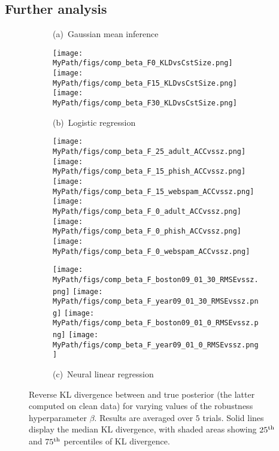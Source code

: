 \subsection{Further analysis}
\label{sec:sensitivity}

\begin{figure}[!tp]
	\begin{subfigure}[]{0.995\textwidth} 
		\centering
		\caption{(a)~Gaussian mean inference}
		\centering
		\texttt{[image: \\MyPath/figs/comp\_beta\_F0\_KLDvsCstSize.png]}
		\centering
		\hfill
		\texttt{[image: \\MyPath/figs/comp\_beta\_F15\_KLDvsCstSize.png]}
		\centering
		\hfill
		\texttt{[image: \\MyPath/figs/comp\_beta\_F30\_KLDvsCstSize.png]}
		\centering
		\caption{(b)~Logistic regression}
		\centering 
		\hfill
		\texttt{[image: \\MyPath/figs/comp\_beta\_F\_25\_adult\_ACCvssz.png]}
		\centering
		\hfil
		\texttt{[image: \\MyPath/figs/comp\_beta\_F\_15\_phish\_ACCvssz.png]}
		\centering
		\hfill
		\texttt{[image: \\MyPath/figs/comp\_beta\_F\_15\_webspam\_ACCvssz.png]}
		\centering
		\texttt{[image: \\MyPath/figs/comp\_beta\_F\_0\_adult\_ACCvssz.png]}
		\centering
		\hfill
		\texttt{[image: \\MyPath/figs/comp\_beta\_F\_0\_phish\_ACCvssz.png]}
		\centering
		\hfill
		\texttt{[image: \\MyPath/figs/comp\_beta\_F\_0\_webspam\_ACCvssz.png]}
		\centering
		\caption{(c)~Neural linear regression}
		\centering
		\texttt{[image: \\MyPath/figs/comp\_beta\_F\_boston09\_01\_30\_RMSEvssz.png]}
		\centering
		\texttt{[image: \\MyPath/figs/comp\_beta\_F\_year09\_01\_30\_RMSEvssz.png]}
		\centering
		\texttt{[image: \\MyPath/figs/comp\_beta\_F\_boston09\_01\_0\_RMSEvssz.png]}
		\centering
		\texttt{[image: \\MyPath/figs/comp\_beta\_F\_year09\_01\_0\_RMSEvssz.png]}
	\end{subfigure}	
	\centering
	\caption{Reverse KL divergence between \bcores{} and true posterior (the latter computed on clean data) for varying values of the robustness hyperparameter $\beta$. Results are averaged over $5$ trials. Solid lines display the median KL divergence, with shaded areas showing $25\textsuperscript{th}$ and $75\textsuperscript{th}$ percentiles of KL divergence.}
	\label{fig:beta_sens}
\end{figure}


